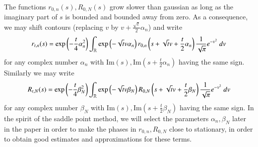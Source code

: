 The functions $r_{0,n}(s), R_{0,N}(s)$ grow slower than gaussian as long as the imaginary part of $s$ is bounded and bounded away from zero.  As a consequence, we may shift contours (replacing $v$ by $v + \frac{\sqrt{t}}{2} \alpha_n$) and write
\begin{equation}\label{rtn-def}
 r_{t,n}(s) = \exp\left( - \frac{t}{4} \alpha_n^2\right) \int_{\mathbb{R}} \exp\left( - \sqrt{t} v \alpha_n\right) r_{0,n}\left( s + \sqrt{t} v + \frac{t}{2} \alpha_n\right) \frac{1}{\sqrt{\pi}} e^{-v^2}\ dv
\end{equation}
for any complex number $\alpha_n$ with $\mathrm{Im}(s), \mathrm{Im}(s + \frac{t}{2} \alpha_n)$ having the same sign.  Similarly we may write
\begin{equation}\label{RTN-def}
 R_{t,N}(s) = \exp\left( - \frac{t}{4} \beta_N^2\right) \int_{\mathbb{R}} \exp\left( - \sqrt{t} v \beta_N\right) R_{0,N}\left( s + \sqrt{t} v + \frac{t}{2} \beta_N\right) \frac{1}{\sqrt{\pi}} e^{-v^2}\ dv
\end{equation}
for any complex number $\beta_N$ with $\mathrm{Im}(s), \mathrm{Im}(s + \frac{t}{2} \beta_N)$ having the same sign.  In the spirit of the saddle point method, we will select the parameters $\alpha_n, \beta_N$ later in the paper in order to make the phases in $r_{0,n}, R_{0,N}$ close to stationary, in order to obtain good estimates and approximations for these terms.










